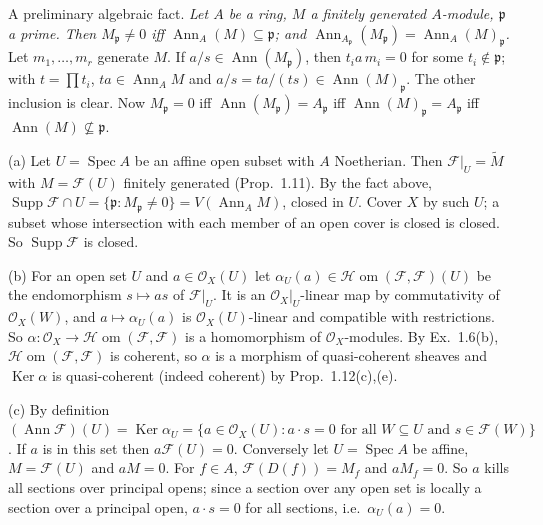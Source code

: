 \documentclass[11pt]{article}
\begin{document}
A preliminary algebraic fact. \emph{Let $A$ be a ring, $M$ a finitely generated $A$-module, $\mathfrak{p}$ a prime. Then $M_\mathfrak{p}\neq0$ iff $\operatorname{Ann}_A(M)\subseteq\mathfrak{p}$; and $\operatorname{Ann}_{A_\mathfrak{p}}(M_\mathfrak{p})=\operatorname{Ann}_A(M)_\mathfrak{p}$.} Let $m_1,\dots,m_r$ generate $M$. If $a/s\in\operatorname{Ann}(M_\mathfrak{p})$, then $t_ia\,m_i=0$ for some $t_i\notin\mathfrak{p}$; with $t=\prod t_i$, $ta\in\operatorname{Ann}_AM$ and $a/s=ta/(ts)\in\operatorname{Ann}(M)_\mathfrak{p}$. The other inclusion is clear. Now $M_\mathfrak{p}=0$ iff $\operatorname{Ann}(M_\mathfrak{p})=A_\mathfrak{p}$ iff $\operatorname{Ann}(M)_\mathfrak{p}=A_\mathfrak{p}$ iff $\operatorname{Ann}(M)\not\subseteq\mathfrak{p}$.

(a) Let $U=\operatorname{Spec}A$ be an affine open subset with $A$ Noetherian. Then $\mathcal{F}|_U=\widetilde M$ with $M=\mathcal{F}(U)$ finitely generated (Prop.~1.11). By the fact above, $\operatorname{Supp}\mathcal{F}\cap U=\{\mathfrak{p}:M_\mathfrak{p}\neq0\}=V(\operatorname{Ann}_AM)$, closed in $U$. Cover $X$ by such $U$; a subset whose intersection with each member of an open cover is closed is closed. So $\operatorname{Supp}\mathcal{F}$ is closed.

(b) For an open set $U$ and $a\in\mathcal{O}_X(U)$ let $\alpha_U(a)\in\mathcal{H}\!\operatorname{om}(\mathcal{F},\mathcal{F})(U)$ be the endomorphism $s\mapsto as$ of $\mathcal{F}|_U$. It is an $\mathcal{O}_X|_U$-linear map by commutativity of $\mathcal{O}_X(W)$, and $a\mapsto\alpha_U(a)$ is $\mathcal{O}_X(U)$-linear and compatible with restrictions. So $\alpha:\mathcal{O}_X\to\mathcal{H}\!\operatorname{om}(\mathcal{F},\mathcal{F})$ is a homomorphism of $\mathcal{O}_X$-modules. By Ex.~1.6(b), $\mathcal{H}\!\operatorname{om}(\mathcal{F},\mathcal{F})$ is coherent, so $\alpha$ is a morphism of quasi-coherent sheaves and $\operatorname{Ker}\alpha$ is quasi-coherent (indeed coherent) by Prop.~1.12(c),(e).

(c) By definition $(\operatorname{Ann}\mathcal{F})(U)=\operatorname{Ker}\alpha_U=\{a\in\mathcal{O}_X(U): a\cdot s=0\text{ for all }W\subseteq U\text{ and }s\in\mathcal{F}(W)\}$. If $a$ is in this set then $a\mathcal{F}(U)=0$. Conversely let $U=\operatorname{Spec}A$ be affine, $M=\mathcal{F}(U)$ and $aM=0$. For $f\in A$, $\mathcal{F}(D(f))=M_f$ and $aM_f=0$. So $a$ kills all sections over principal opens; since a section over any open set is locally a section over a principal open, $a\cdot s=0$ for all sections, i.e.\ $\alpha_U(a)=0$.
\end{document}

